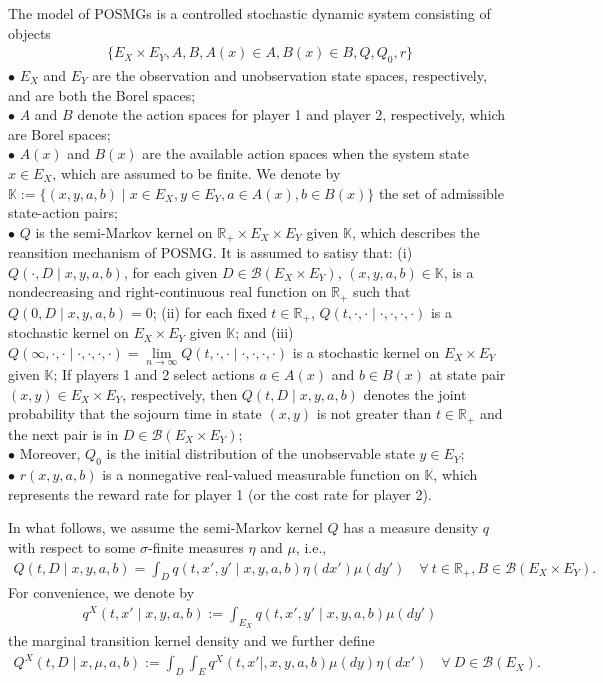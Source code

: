 \documentclass[12pt]{article}
\begin{document}
The model of POSMGs is a controlled stochastic dynamic system consisting of objects
\begin{eqnarray}\label{model}
	\{E_X\times E_Y, A, B, A(x)\in A, B(x)\in B, Q, Q_0, r\}
\end{eqnarray}
$\bullet$  $E_X$ and $E_Y$ are  the observation and unobservation state spaces, respectively, and are both the Borel spaces;
\\$\bullet$ $A$ and $B$ denote the action spaces for player 1 and player 2, respectively, which are Borel spaces;
\\$\bullet$  $A(x)$ and $B(x)$ are the available action spaces when the system state $x\in E_X$, which are assumed to be finite.  We denote by $\mathbb{K}:=\{(x,y,a,b)\mid x\in E_X, y\in E_Y,a\in A(x), b\in B(x)\}$ the set of admissible state-action
pairs;
\\$\bullet$ $Q$ is the semi-Markov kernel on $\mathbb{R}_+\times E_X\times E_Y$ given $\mathbb{K}$, which describes the reansition mechanism of POSMG.
It is assumed to satisy that: (i) $Q(\cdot, D\mid x,y,a,b)$, for each given $D\in\mathscr{B}(E_X\times E_Y)$, $(x,y,a,b)\in\mathbb{K}$, is a nondecreasing and right-continuous real function on $\mathbb{R}_+$ such that $Q(0,D\mid x,y,a,b)=0$; (ii) for each fixed $t\in \mathbb{R}_+$, $Q(t,\cdot,\cdot\mid \cdot,\cdot,\cdot,\cdot)$ is a stochastic kernel on $E_X\times E_Y$ given $\mathbb{K}$; and (iii) $Q(\infty,\cdot,\cdot\mid \cdot,\cdot,\cdot,\cdot)=\lim\limits_{n\to\infty}Q(t,\cdot,\cdot\mid \cdot,\cdot,\cdot,\cdot)$ is a stochastic kernel on $E_X\times E_Y$ given $\mathbb{K}$;
If players 1 and 2 select actions $a\in A(x)$ and $b\in B(x)$ at state pair $(x,y)\in E_X\times E_Y$, respectively, then $Q(t,D\mid x,y,a,b)$ denotes the joint probability that the sojourn time in state $(x,y)$ is not greater than $t\in\mathbb{R}_+$ and the next pair is in $D\in\mathscr{B}(E_X\times E_Y)$;
\\$\bullet$ Moreover, $Q_0$ is the initial distribution of the unobservable state $y\in E_Y$;
\\$\bullet$ $r(x,y,a,b)$ is a nonnegative real-valued measurable function on $\mathbb{K}$, which represents the reward rate for player 1 (or the cost rate for player 2).

In what follows, we assume the semi-Markov kernel $Q$ has a measure density $q$ with respect to some $\sigma$-finite measures $\eta$ and $\mu$, i.e.,
\begin{eqnarray*}
	Q(t,D\mid x,y,a,b)=\int_{D}q(t,x',y'\mid x,y,a,b)\eta(dx')\mu(dy')\quad\forall ~t\in\mathbb{R}_+, B\in\mathscr{B}(E_X\times E_Y).
\end{eqnarray*}
For convenience, we denote by
\begin{eqnarray*}
	q^X(t,x'\mid x,y,a,b):=\int_{E_X}q(t,x',y'\mid x,y,a,b)\mu(dy')
\end{eqnarray*}
the marginal transition kernel density and we further define
\begin{eqnarray*}
	Q^X(t,D\mid x,{\mu},a,b):=\int_D\int_Eq^X(t,x'\mid,x,y,a,b){\mu}(dy)\eta(dx')\quad\forall ~D\in \mathscr{B}(E_X).
\end{eqnarray*}
\end{document}
